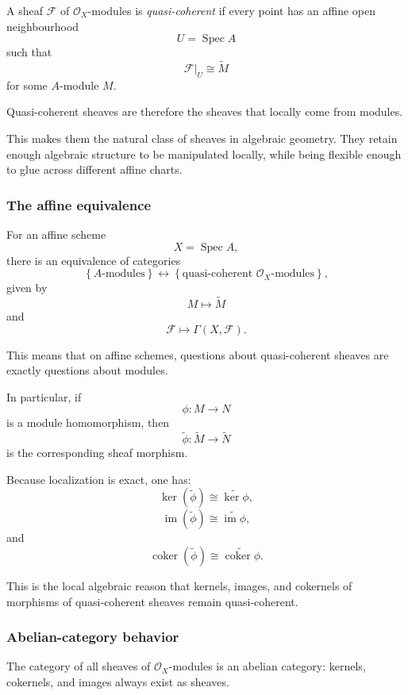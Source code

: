 \begin{definition}
	A sheaf \(\mathcal{F}\) of \(\mathcal{O}_X\)-modules is \emph{quasi-coherent} if every point has an affine open neighbourhood
	\[
	U=\operatorname{Spec} A
	\]
	such that
	\[
	\mathcal{F}|_U\cong\widetilde{M}
	\]
	for some \(A\)-module \(M\).
\end{definition}

Quasi-coherent sheaves are therefore the sheaves that locally come from modules.

This makes them the natural class of sheaves in algebraic geometry. They retain enough algebraic structure to be manipulated locally, while being flexible enough to glue across different affine charts.

\subsubsection{The affine equivalence}

For an affine scheme
\[
X=\operatorname{Spec} A,
\]
there is an equivalence of categories
\[
\left\{
A\text{-modules}
\right\}
\longleftrightarrow
\left\{
\text{quasi-coherent }\mathcal{O}_X\text{-modules}
\right\},
\]
given by
\[
M\longmapsto \widetilde M
\]
and
\[
\mathcal{F}\longmapsto \Gamma(X,\mathcal{F}).
\]

This means that on affine schemes, questions about quasi-coherent sheaves are exactly questions about modules.

In particular, if
\[
\phi:M\longrightarrow N
\]
is a module homomorphism, then
\[
\widetilde{\phi}:\widetilde{M}\longrightarrow\widetilde{N}
\]
is the corresponding sheaf morphism.

Because localization is exact, one has:
\[
\ker(\widetilde{\phi})
\cong
\widetilde{\ker\phi},
\]
\[
\operatorname{im}(\widetilde{\phi})
\cong
\widetilde{\operatorname{im}\phi},
\]
and
\[
\operatorname{coker}(\widetilde{\phi})
\cong
\widetilde{\operatorname{coker}\phi}.
\]

This is the local algebraic reason that kernels, images, and cokernels of morphisms of quasi-coherent sheaves remain quasi-coherent.

\subsubsection{Abelian-category behavior}

The category of all sheaves of \(\mathcal{O}_X\)-modules is an abelian category: kernels, cokernels, and images always exist as sheaves.

